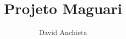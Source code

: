 \documentclass[a4paper,12pt]{article}
\title{Projeto Maguari}
\author{David Anchieta}
\begin{document}
\maketitle

\imprimeinstituicao
\end{document}
